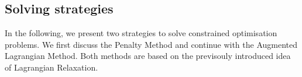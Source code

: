 
\subsection{Solving strategies}
In the following, we present two strategies to solve constrained optimisation problems. We first discuss the Penalty Method and continue with the Augmented Lagrangian Method. Both methods are based on the previsouly introduced idea of Lagrangian Relaxation.
